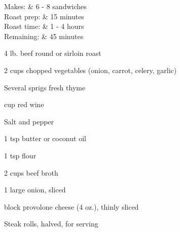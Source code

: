 \documentclass{RecipeBook}
\begin{document}
\begin{shrink}

\begin{info}
	Makes: & 6 - 8 sandwiches \\
	Roast prep: & 15 minutes \\
	Roast time: & 1 - 4 hours \\
	Remaining: & 45 minutes
\end{info}

\begin{ingredients}
	\item{4 lb. beef round or sirloin roast}
	\item{2 cups chopped vegetables (onion, carrot, celery, garlic)}
	\item{Several sprigs fresh thyme}
	\item{ cup red wine}
	\item{Salt and pepper}
	\item{1 tsp butter or coconut oil}
	\item{1 tsp flour}
	\item{2 cups beef broth}
	\item{1 large onion, sliced}
	\item{ block provolone cheese (4 oz.), thinly sliced}
	\item{Steak rolls, halved, for serving}
\end{ingredients}


\end{shrink}
\end{document}
